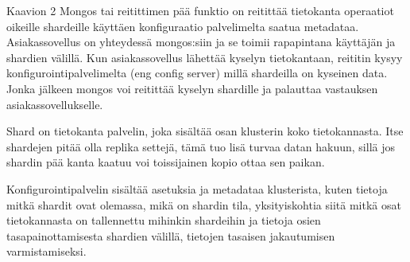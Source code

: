 

Kaavion 2 Mongos tai reitittimen pää funktio on reitittää tietokanta operaatiot oikeille shardeille käyttäen konfiguraatio palvelimelta saatua metadataa.
Asiakassovellus on yhteydessä mongos:siin ja se toimii rapapintana käyttäjän ja shardien välillä. 
Kun asiakassovellus lähettää kyselyn tietokantaan, reititin kysyy konfigurointipalvelimelta (eng config server) millä shardeilla on kyseinen data. 
Jonka jälkeen mongos voi reitittää kyselyn shardille ja palauttaa vastauksen asiakassovellukselle.
\medskip

Shard on tietokanta palvelin, joka sisältää osan klusterin koko tietokannasta.
Itse shardejen pitää olla replika settejä, 
tämä tuo lisä turvaa datan hakuun, sillä jos shardin pää kanta kaatuu voi toissijainen kopio ottaa sen paikan. 
\medskip



Konfigurointipalvelin sisältää asetuksia ja metadataa klusterista, 
kuten tietoja mitkä shardit ovat olemassa, mikä on shardin tila,
yksityiskohtia siitä mitkä osat tietokannasta on tallennettu mihinkin shardeihin
ja tietoja osien tasapainottamisesta shardien välillä, tietojen tasaisen jakautumisen varmistamiseksi.



% 
\iffalse
\subsubsection{Nosql Dokumentti}


jotain nosql yleisesti, jotain dokumentti vs sql
jotain dokumenteista yleisesti

\medskip

NoSql tietokannoilla on monta tapaa säilyttää dataa, jotain relatiivisesta kannasta. 

dokumentti pohjainen tietokanta, jota mongodb käyttää, tallettaa tiedot jossain avain arvo tiedosto formaatissa kuten xml, yaml ja json. \citemissing
\medskip


MongoDB tallettaa tiedont BSON muodossa, joka on binaari edustus JSON formaatista.\labcite{mongodb24a}
tietokannasta dokumentteja voi hakea niiden uniikkien tunnisteiden tai sisällön arvojen perusteella
\medskip
\fi


















